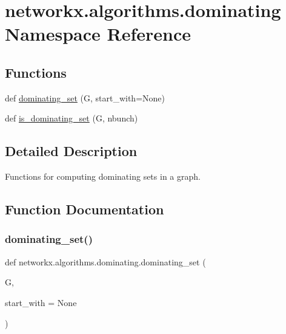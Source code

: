 \hypertarget{namespacenetworkx_1_1algorithms_1_1dominating}{}\section{networkx.\+algorithms.\+dominating Namespace Reference}
\label{namespacenetworkx_1_1algorithms_1_1dominating}
\subsection*{Functions}
\begin{DoxyCompactItemize}
\item 
def \hyperlink{namespacenetworkx_1_1algorithms_1_1dominating_a5e836ea6e7320eed4dbcc01f9685187e}{dominating\+\_\+set} (G, start\+\_\+with=None)
\item 
def \hyperlink{namespacenetworkx_1_1algorithms_1_1dominating_a69dcbfa764707fbc25fbb36133a8cf90}{is\+\_\+dominating\+\_\+set} (G, nbunch)
\end{DoxyCompactItemize}


\subsection{Detailed Description}
\begin{DoxyVerb}Functions for computing dominating sets in a graph.\end{DoxyVerb}
 

\subsection{Function Documentation}
\mbox{\label{namespacenetworkx_1_1algorithms_1_1dominating_a5e836ea6e7320eed4dbcc01f9685187e}} 
\subsubsection{\texorpdfstring{dominating\+\_\+set()}{dominating\_set()}}
{\footnotesize\ttfamily def networkx.\+algorithms.\+dominating.\+dominating\+\_\+set (\begin{DoxyParamCaption}\item[{}]{G,  }\item[{}]{start\+\_\+with = {\ttfamily None} }\end{DoxyParamCaption})}

